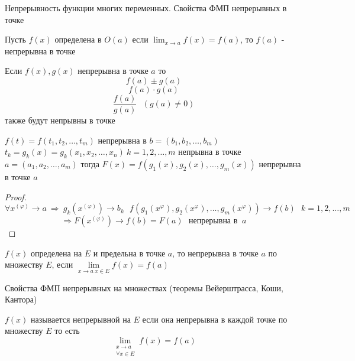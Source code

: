 \begin{title}[\Large]
  Непрерывность функции многих переменных. Свойства ФМП непрерывных в точке
\end{title}

\begin{define}
  Пусть $f(x)$ определена в $O(a)$ если $\lim_{x \to a} f(x) = f(a)$, то
  $f(a)$ - непрерывна в точке
\end{define}

\begin{block}[Свойства]
  Если $f(x), g(x)$ непрерывна в точке $a$ то
  $$
  f(a) \pm g(a)
  $$
  $$
  f(a) \cdot g(a)
  $$
  $$
  \frac{f(a)}{g(a)} ~~~ (g(a) \not= 0)
  $$
  также будут непрывны в точке
\end{block}

\begin{theorem}
  $f(t) = f(t_1, t_2, \ldots, t_m)$ непрерывна в $b = (b_1, b_2, \ldots, b_m)$
  $t_k = g_k(x) = g_k(x_1, x_2, \ldots, x_n) ~ k = 1,2, \ldots, m$ непрывна в
  точке $a = (a_1, a_2, \ldots, a_m)$ тогда
  $F(x) = f(g_1(x), g_2(x), \ldots, g_m(x))$ непрерывна в
  точке $a$
\end{theorem}

\begin{proof}
  $$
  \forall x^{(\varphi)} \to a ~ \Rightarrow ~ g_k(x^{(\varphi)}) \to b_k ~~~
  f(g_1(x^{\varphi}), g_2(x^{\varphi}), \ldots, g_m(x^{\varphi})) \to f(b) ~~~
  k = 1,2, \ldots, m
  $$
  $$
  \Rightarrow F(x^{(\varphi)}) \to f(b) = F(a) ~~~ \text{непрерывна в } ~ a
  $$
\end{proof}

\begin{define}
  $f(x)$ определена на $E$ и предельна в точке $a$, то непрерывна в точке $a$
  по множеству $E$, если $\lim \limits_{x \to a ~ x \in E} f(x) = f(a)$
\end{define}

\begin{title}[\Large]
  Свойства ФМП непрерывных на множествах (теоремы Вейерштрасса, Коши, Кантора)
\end{title}

\begin{define}
  $f(x)$ называется непрерывной на $E$ если она непрерывна в каждой точке по
  множеству $E$ то eсть
  $$
  \lim_{\substack{x \to a \\ \forall x \in E}} f(x) = f(a)
  $$
\end{define}

